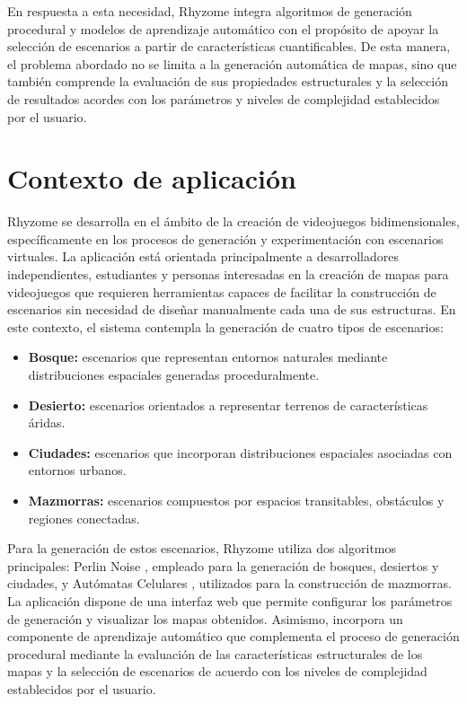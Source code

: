 En respuesta a esta necesidad, Rhyzome integra algoritmos de generación procedural y modelos de aprendizaje automático con el propósito de apoyar la selección de escenarios a partir de características cuantificables. De esta manera, el problema abordado no se limita a la generación automática de mapas, sino que también comprende la evaluación de sus propiedades estructurales y la selección de resultados acordes con los parámetros y niveles de complejidad establecidos por el usuario. 


\section{Contexto de aplicación}

Rhyzome se desarrolla en el ámbito de la creación de videojuegos bidimensionales, específicamente en los procesos de generación y experimentación con escenarios virtuales. La aplicación está orientada principalmente a desarrolladores independientes, estudiantes y personas interesadas en la creación de mapas para videojuegos que requieren herramientas capaces de facilitar la construcción de escenarios sin necesidad de diseñar manualmente cada una de sus estructuras. En este contexto, el sistema contempla la generación de cuatro tipos de escenarios:

\begin{itemize}
    \item \textbf{Bosque:}
    escenarios que representan entornos naturales mediante distribuciones espaciales generadas proceduralmente.

    \item \textbf{Desierto:}
    escenarios orientados a representar terrenos de características áridas.

    \item \textbf{Ciudades:}
    escenarios que incorporan distribuciones espaciales asociadas con entornos urbanos.

    \item \textbf{Mazmorras:}
    escenarios compuestos por espacios transitables, obstáculos y regiones conectadas.
\end{itemize}

Para la generación de estos escenarios, Rhyzome utiliza dos algoritmos principales: Perlin Noise \parencite{perlin1985}, empleado para la generación de bosques, desiertos y ciudades, y Autómatas Celulares \parencite{johnson2010}, utilizados para la construcción de mazmorras. La aplicación dispone de una interfaz web que permite configurar los parámetros de generación y visualizar los mapas obtenidos. Asimismo, incorpora un componente de aprendizaje automático que complementa el proceso de generación procedural mediante la evaluación de las características estructurales de los mapas y la selección de escenarios de acuerdo con los niveles de complejidad establecidos por el usuario.

